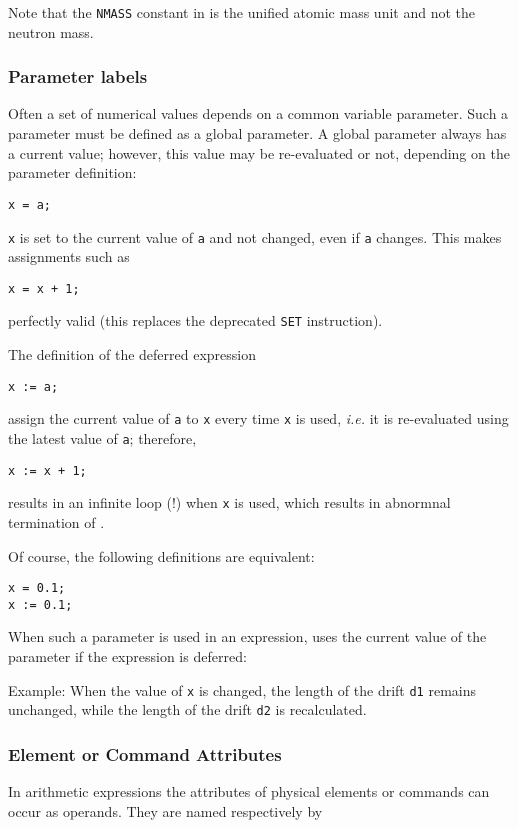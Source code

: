 Note that the \texttt{NMASS} constant in \madx is the unified atomic mass unit and 
not the neutron mass.

\subsubsection{Parameter labels} 
Often a set of numerical values depends on a common variable
parameter. Such a parameter must be defined as a global parameter. A
global parameter always has a current value; however, this value may be
re-evaluated or not, depending on the parameter definition:  
\begin{verbatim}
x = a;
\end{verbatim} 
\texttt{x} is set to the current value of \texttt{a} and not changed,
even if \texttt{a} changes. This makes assignments such as  
\begin{verbatim}
x = x + 1;
\end{verbatim} 
perfectly valid (this replaces the deprecated \texttt{SET} instruction).

The definition of the deferred expression  
\begin{verbatim}
x := a;
\end{verbatim} 
assign the current value of \texttt{a} to \texttt{x} every time
\texttt{x} is used, \textsl{i.e.} it is re-evaluated using the latest
value of \texttt{a}; therefore,   
\begin{verbatim}
x := x + 1;
\end{verbatim} 
results in an infinite loop (!) when \texttt{x} is used, which results
in abnormnal termination of \madx. 

Of course, the following definitions are equivalent:  
\begin{verbatim}
x = 0.1;
x := 0.1;
\end{verbatim}

When such a parameter is used in an expression, \madx uses the current
value of the parameter if the expression is deferred:  

Example: 
When the value of \texttt{x} is changed, the length of the drift
\texttt{d1} remains unchanged, while the length of the drift \texttt{d2}
is recalculated.

\subsubsection{Element or Command Attributes} 
In arithmetic expressions the attributes of physical elements or
commands can occur as operands. They are named respectively by  

